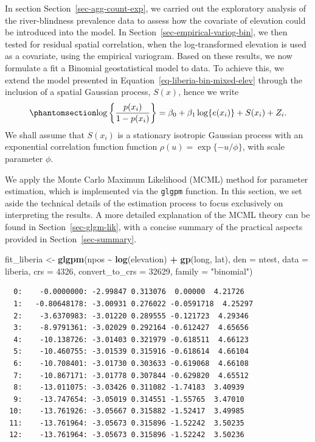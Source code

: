 \documentclass[
  letterpaper,
]{krantz}
\newenvironment{Shaded}{\begin{snugshade}}{\end{snugshade}}
\newcommand{\AttributeTok}[1]{\textcolor[rgb]{0.13,0.29,0.53}{#1}}
\newcommand{\DecValTok}[1]{\textcolor[rgb]{0.00,0.00,0.81}{#1}}
\newcommand{\FunctionTok}[1]{\textcolor[rgb]{0.13,0.29,0.53}{\textbf{#1}}}
\newcommand{\NormalTok}[1]{#1}
\newcommand{\OtherTok}[1]{\textcolor[rgb]{0.56,0.35,0.01}{#1}}
\newcommand{\SpecialCharTok}[1]{\textcolor[rgb]{0.81,0.36,0.00}{\textbf{#1}}}
\newcommand{\StringTok}[1]{\textcolor[rgb]{0.31,0.60,0.02}{#1}}
\begin{document}
In section Section~\ref{sec-agg-count-exp}, we carried out the
exploratory analysis of the river-blindness prevalence data to assess
how the covariate of elevation could be introduced into the model. In
Section~\ref{sec-empirical-variog-bin}, we then tested for residual
spatial correlation, when the log-transformed elevation is used as a
covariate, using the empirical variogram. Based on these results, we now
formulate a fit a Binomial geostatistical model to data. To achieve
this, we extend the model presented in
Equation~\ref{eq-liberia-bin-mixed-elev} through the inclusion of a
spatial Gaussian process, \(S(x)\), hence we write
\begin{equation}\phantomsection\label{eq-liberia-geostat-bin-elev}{
\log\left\{\frac{p(x_i)}{1-p(x_i)}\right\} = \beta_{0} + \beta_{1}\log\{e(x_i)\} + S(x_i) + Z_i.
}\end{equation} We shall assume that \(S(x_i)\) is a stationary
isotropic Gaussian process with an exponential correlation function
function \(\rho(u) = \exp\{-u/\phi\}\), with scale parameter \(\phi\).

We apply the Monte Carlo Maximum Likelihood (MCML) method for parameter
estimation, which is implemented via the \texttt{glgpm} function. In
this section, we set aside the technical details of the estimation
process to focus exclusively on interpreting the results. A more
detailed explanation of the MCML theory can be found in
Section~\ref{sec-glgm-lik}, with a concise summary of the practical
aspects provided in Section~\ref{sec-summary}.

\begin{Shaded}
\begin{Highlighting}[]
\NormalTok{fit\_liberia }\OtherTok{\textless{}{-}} 
  \FunctionTok{glgpm}\NormalTok{(npos }\SpecialCharTok{\textasciitilde{}} \FunctionTok{log}\NormalTok{(elevation) }\SpecialCharTok{+} \FunctionTok{gp}\NormalTok{(long, lat),}
        \AttributeTok{den =}\NormalTok{ ntest, }\AttributeTok{data =}\NormalTok{ liberia,}
        \AttributeTok{crs =} \DecValTok{4326}\NormalTok{,}
        \AttributeTok{convert\_to\_crs =} \DecValTok{32629}\NormalTok{,}
        \AttributeTok{family =} \StringTok{"binomial"}\NormalTok{)}
\end{Highlighting}
\end{Shaded}

\begin{verbatim}
  0:    -0.0000000: -2.99847 0.313076  0.00000  4.21726
  1:   -0.80648178: -3.00931 0.276022 -0.0591718  4.25297
  2:    -3.6370983: -3.01220 0.289555 -0.121723  4.29346
  3:    -8.9791361: -3.02029 0.292164 -0.612427  4.65656
  4:    -10.138726: -3.01403 0.321979 -0.618511  4.66123
  5:    -10.460755: -3.01539 0.315916 -0.618614  4.66104
  6:    -10.708401: -3.01730 0.303633 -0.619068  4.66108
  7:    -10.867171: -3.01778 0.307844 -0.629820  4.65512
  8:    -13.011075: -3.03426 0.311082 -1.74183  3.40939
  9:    -13.747654: -3.05019 0.314551 -1.55765  3.47010
 10:    -13.761926: -3.05667 0.315882 -1.52417  3.49985
 11:    -13.761964: -3.05673 0.315896 -1.52242  3.50235
 12:    -13.761964: -3.05673 0.315896 -1.52242  3.50236
\end{verbatim}
\end{document}

